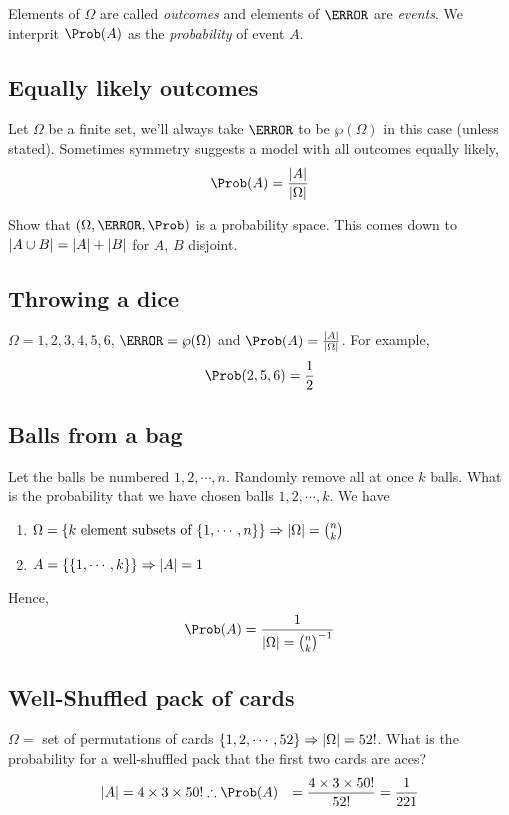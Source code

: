 \documentclass{article}
\numberwithin{equation}{section}
\begin{document}
Elements of $\Omega$ are called \emph{outcomes} and elements of $\F$ are \emph{events}.
We interprit $\Prob(A)$ as the \emph{probability} of event $A$.

\subsection{Equally likely outcomes}
Let $\Omega$ be a finite set, we'll always take $\F$ to be $\wp(\Omega)$ in this case (unless stated).
Sometimes symmetry suggests a model with all outcomes equally likely,
\[\Prob(A) = \frac{\abs{A}}{\abs{\Omega}}\]

\begin{ex}
    Show that $(\Omega, \F, \Prob)$ is a probability space.
    This comes down to $\left\lvert A \cup B\right\rvert = \left\lvert A\right\rvert + \left\lvert B\right\rvert$ for $A$, $B$ disjoint.
\end{ex}

\subsection{Throwing a dice}
$\Omega = {1, 2, 3, 4, 5, 6}$, $\F = \wp(\Omega)$ and $\Prob(A) = \frac{\abs{A}}{\abs{\Omega}}$.
For example,
\[\Prob({2, 5, 6}) = \frac{1}{2}\]

\subsection{Balls from a bag}
Let the balls be numbered $1, 2, \cdots, n$. Randomly remove all at once $k$ balls. 
What is the probability that we have chosen balls $1, 2, \cdots, k$.
We have 
\begin{enumerate}
    \item $\Omega = \{k \text{ element subsets of } \{1, \cdots, n\}\} \Rightarrow \left\lvert \Omega\right\rvert = \binom{n}{k}$
    \item $A = \{\{1, \cdots, k\}\} \Rightarrow \left\lvert A\right\rvert = 1$
\end{enumerate}
Hence,
\[\Prob(A) = \frac{1}{\abs{\Omega} = \binom{n}{k}^{-1}}\]

\subsection{Well-Shuffled pack of cards}
$\Omega =$ set of permutations of cards $\{1, 2, \cdots, 52\} \Rightarrow \left\lvert \Omega\right\rvert = 52!$.
What is the probability for a well-shuffled pack that the first two cards are aces?
\begin{align*}
    \abs{A} &= 4 \times 3 \times 50! 
    \therefore \Prob(A) &= \frac{4 \times 3 \times 50! }{52!} = \frac{1}{221}
\end{align*}
\end{document}
